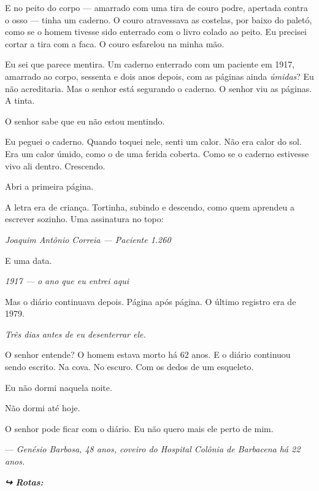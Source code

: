\noindent E no peito do corpo --- amarrado com uma tira de couro podre, apertada contra o osso --- tinha um caderno. O couro atravessava as costelas, por baixo do paletó, como se o homem tivesse sido enterrado com o livro colado ao peito. Eu precisei cortar a tira com a faca. O couro esfarelou na minha mão.

\noindent Eu sei que parece mentira. Um caderno enterrado com um paciente em 1917, amarrado ao corpo, sessenta e dois anos depois, com as páginas ainda \textit{úmidas}? Eu não acreditaria. Mas o senhor está segurando o caderno. O senhor viu as páginas. A tinta.

\noindent O senhor sabe que eu não estou mentindo.

\noindent Eu peguei o caderno. Quando toquei nele, senti um calor. Não era calor do sol. Era um calor úmido, como o de uma ferida coberta. Como se o caderno estivesse vivo ali dentro. Crescendo.

\noindent Abri a primeira página.

\noindent A letra era de criança. Tortinha, subindo e descendo, como quem aprendeu a escrever sozinho. Uma assinatura no topo:

\noindent \textit{Joaquim Antônio Correia --- Paciente 1.260}

\noindent E uma data.

\noindent \textit{1917 --- o ano que eu entrei aqui}

\noindent Mas o diário continuava depois. Página após página. O último registro era de 1979.

\noindent \textit{Três dias antes de eu desenterrar ele.}

\noindent O senhor entende? O homem estava morto há 62 anos. E o diário continuou sendo escrito. Na cova. No escuro. Com os dedos de um esqueleto.

\noindent Eu não dormi naquela noite.

\noindent Não dormi até hoje.

\noindent O senhor pode ficar com o diário. Eu não quero mais ele perto de mim.

\noindent --- \textit{Genésio Barbosa, 48 anos, coveiro do Hospital Colônia de Barbacena há 22 anos.}

\vspace{0.5em}
\noindent\textit{\textbf{↪ Rotas:}  \rotasep {}}